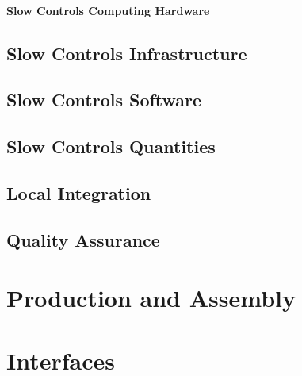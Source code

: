 \paragraph{Slow Controls Computing Hardware}


\subsection{Slow Controls Infrastructure}
\label{sec:fddp-slow-cryo-slow-infra}

\subsection{Slow Controls Software}
\label{sec:fddp-slow-cryo-sw}

\subsection{Slow Controls Quantities}
\label{sec:fddp-slow-cryo-quant}

\subsection{Local Integration}
\label{sec:fddp-slow-cryo-slow-loc-integ}

\subsection{Quality Assurance}
\label{sec:fddp-slow-cryo-slow-qa}



\section{Production and Assembly}
\label{sec:fddp-slow-cryo-prod-assy}




\section{Interfaces}
\label{sec:fddp-slow-cryo-intfc}

